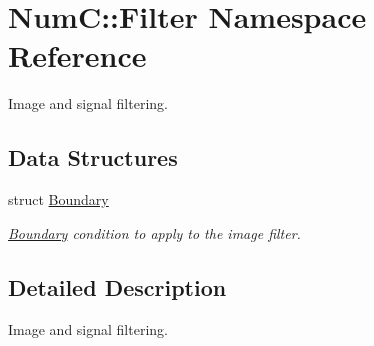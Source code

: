 \hypertarget{namespace_num_c_1_1_filter}{}\section{NumC\+:\+:Filter Namespace Reference}
\label{namespace_num_c_1_1_filter}


Image and signal filtering.  


\subsection*{Data Structures}
\begin{DoxyCompactItemize}
\item 
struct \mbox{\hyperlink{struct_num_c_1_1_filter_1_1_boundary}{Boundary}}
\begin{DoxyCompactList}\small\item\em \mbox{\hyperlink{struct_num_c_1_1_filter_1_1_boundary}{Boundary}} condition to apply to the image filter. \end{DoxyCompactList}\end{DoxyCompactItemize}


\subsection{Detailed Description}
Image and signal filtering. 